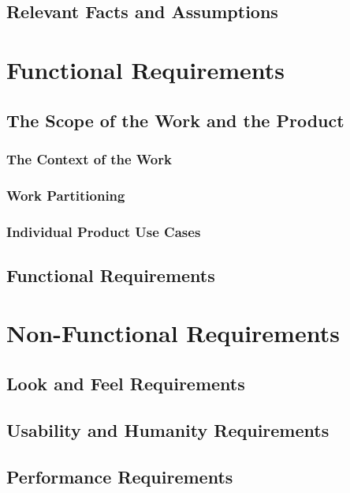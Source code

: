 \documentclass[11pt]{article}
\begin{document}
\subsection{Relevant Facts and Assumptions}

\section{Functional Requirements}

\subsection{The Scope of the Work and the Product}

\subsubsection{The Context of the Work}
\subsubsection{Work Partitioning}
\subsubsection{Individual Product Use Cases}

\subsection{Functional Requirements}
\section{Non-Functional Requirements}

\subsection{Look and Feel Requirements}

\subsection{Usability and Humanity Requirements}

\subsection{Performance Requirements}
\end{document}
